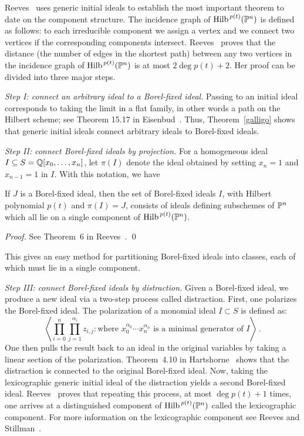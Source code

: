 Reeves~\cite{MR97g:14003} uses generic initial ideals to establish the
most important theorem to date on the component structure.  The
incidence graph of $\operatorname{Hilb}^{\,
p(t)}({\mathbb P}^{n})$ is defined as follows: to each irreducible component
we assign a vertex and we connect two vertices if the corresponding
components intersect.  Reeves~\cite{MR97g:14003} proves that the
distance (the number of edges in the shortest path) between any two
vertices in the incidence graph of $\operatorname{Hilb}^{\, p(t)}({\mathbb P}^{n})$ is at
most $2 \deg p(t)+2$.  Her proof can be divided into three major
steps.

{\em Step I: connect an arbitrary ideal to a Borel-fixed ideal.}
Passing to an initial ideal corresponds to taking the limit in a flat
family, in other words a path on the Hilbert scheme; see Theorem 15.17
in Eisenbud~\cite{MR97a:13001}.  Thus, Theorem~\ref{galligo} shows
that generic initial ideals connect arbitrary
ideals to Borel-fixed ideals.

{\em Step II: connect Borel-fixed ideals by projection.}  For a
homogeneous ideal $I \subseteq S = {\mathbb Q}[x_{0}, \dotsc, x_{n}]$, let
$\pi(I)$ denote the ideal obtained by setting $x_{n}=1$ and
$x_{n-1}=1$ in $I$.  With this notation, we have

\begin{theorem}
If $J$ is a Borel-fixed ideal, then the set of Borel-fixed ideals $I$,
with Hilbert polynomial $p(t)$ and $\pi(I) = J$, consists of ideals
defining subschemes of ${\mathbb P}^{n}$ which all lie on a single component
of $\operatorname{Hilb}^{\, p(t)}({\mathbb P}^{n})$.
\end{theorem}

\begin{proof}
See Theorem~6 in Reeves~\cite{MR97g:14003}. \qed
\end{proof}

\noindent This gives an easy method for partitioning Borel-fixed
ideals into classes, each of which must lie in a single component.

{\em Step III: connect Borel-fixed ideals by distraction.}  Given a
Borel-fixed ideal, we produce a new ideal via a two-step process
called distraction.  First, one polarizes the
Borel-fixed ideal.  The polarization of a monomial
ideal $I \subset S$ is defined as:
\[
\left\langle \prod_{i=0}^{n}\prod_{j=1}^{\alpha_{i}} z_{i,j} : \text{
where $x_{0}^{\alpha_{0}}\dotsb x_{n}^{\alpha_{n}}$ is a minimal
generator of $I$} \right\rangle \, .
\]
One then pulls the result back to an ideal in the original variables
by taking a linear section of the polarization.  Theorem~4.10 in
Hartshorne~\cite{MR35:4232} shows that the distraction is connected to
the original Borel-fixed ideal.  Now, taking the lexicographic generic
initial ideal of the distraction yields a second Borel-fixed ideal.
Reeves~\cite{MR97g:14003} proves that repeating this process, at most
$\deg p(t) + 1$ times, one arrives at a distinguished component of
$\operatorname{Hilb}^{\, p(t)}({\mathbb P}^{n})$ called the lexicographic component.  For
more information on the lexicographic component see Reeves and
Stillman~\cite{MR98m:14003}.

